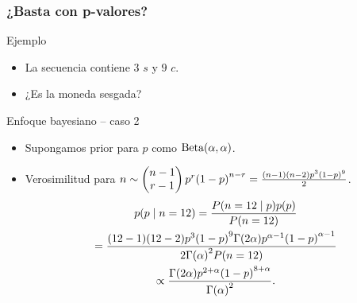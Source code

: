 \documentclass[table]{beamer}
\begin{document}
\begin{frame}
    \frametitle{¿Basta con p-valores?}
    \begin{exampleblock}{Ejemplo}
        \begin{itemize}
            \item La secuencia contiene $3$ $s$ y $9$ $c$.
            \item ¿Es la moneda sesgada?
        \end{itemize}
    \end{exampleblock}
    \begin{block}{Enfoque bayesiano -- caso 2}
        \begin{itemize}
            \item Supongamos prior para $p$ como $\betadist{\alpha}{\alpha}$.
            \item Verosimilitud para $n \sim \combin{n - 1}{r - 1} p^{r} \parens{1 - p}^{n - r} = \frac{\parens{n - 1} \parens{n - 2} p^{3} \parens{1 - p}^{9}}{2}$.
                \begin{multline*}
                    \pdf{p \mid n = 12} = \frac{\prob{n = 12 \mid p} \pdf{p}}{\prob{n = 12}}
                    \\
                    = \frac{\parens{12 - 1} \parens{12 - 2} p^{3} \parens{1 - p}^{9} \gammafunc{2 \alpha} p^{\alpha - 1} \parens{1 - p}^{\alpha - 1}}{2 \gammafunc{\alpha}^{2} \prob{n = 12}}
                    \\
                    \propto \frac{\gammafunc{2 \alpha} p^{2 + \alpha} \parens{1 - p}^{8 + \alpha}}{\gammafunc{\alpha}^{2}} .
                \end{multline*}
        \end{itemize}
    \end{block}
\end{frame}
\end{document}
